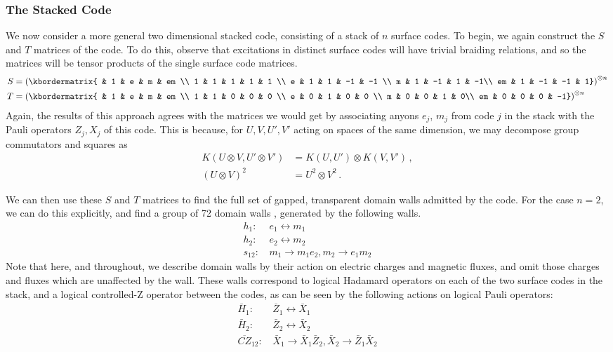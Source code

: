 \documentclass[pra,twocolumn,a4paper,nofootinbib]{revtex4-1}
\begin{document}
\subsubsection{The Stacked Code}
\label{sec:2DStack}
We now consider a more general two dimensional stacked code, consisting of a stack of $n$ surface codes. To begin, we again construct the $S$ and $T$ matrices of the code. To do this, observe that excitations in distinct surface codes will have trivial braiding relations, and so the matrices will be tensor products of the single surface code matrices.
\begin{align}
S &=   \left(\kbordermatrix{  & 1 & e & m & em \\  1 & 1 & 1 & 1 & 1 \\
      e & 1 & 1 & -1 & -1 \\
      m & 1 & -1 & 1 & -1\\
     em & 1 & -1 & -1 & 1}\right)^{\otimes n} \label{eq:S}\\
     T 
     &=\left(\kbordermatrix{ & 1 & e & m & em \\
      1 & 1 & 0 & 0 & 0 \\
      e & 0 & 1 & 0 & 0 \\
      m & 0 & 0 & 1 & 0\\
     em & 0 & 0 & 0 & -1}\right)^{\otimes n} \label{eq:T}
\end{align}
Again, the results of this approach agrees with the matrices we would get by associating anyons $e_j$, $m_j$ from code $j$ in the stack with the Pauli operators $Z_j,X_j$ of this code. This is because, for $U,V,U',V'$ acting on spaces of the same dimension, we may decompose group commutators and squares as
\begin{align}
K(U \otimes V, U' \otimes V') &= K(U,U')\otimes K(V,V') \,,\\
(U \otimes V)^2 &= U^2\otimes V^2\,.
\end{align}

We can then use these $S$ and $T$ matrices to find the full set of gapped, transparent domain walls admitted by the code. For the case $n=2$, we can do this explicitly, and find a group of 72 domain walls \cite{YoshidaA}, generated by the following walls.
\begin{align}
h_1: &\, e_1 \leftrightarrow m_1\\
h_2: &\, e_2 \leftrightarrow m_2\\
s_{12}: &\, m_1 \to m_1e_2, m_2 \to e_1 m_2
\end{align}
Note that here, and throughout, we describe domain walls by their action on electric charges and magnetic fluxes, and omit those charges and fluxes which are unaffected by the wall. These walls correspond to logical Hadamard operators on each of the two surface codes in the stack, and a logical controlled-Z operator between the codes, as can be seen by the following actions on logical Pauli operators:
\begin{align}
\bar{H}_1: &\, \bar{Z}_1 \leftrightarrow \bar{X}_1\\
\bar{H}_2: &\, \bar{Z}_2 \leftrightarrow \bar{X}_2\\
\overline{CZ}_{12}: &\, \bar{X}_1 \to \bar{X}_1\bar{Z}_2, \bar{X}_2 \to \bar{Z}_1 \bar{X}_2
\end{align}
\end{document}
